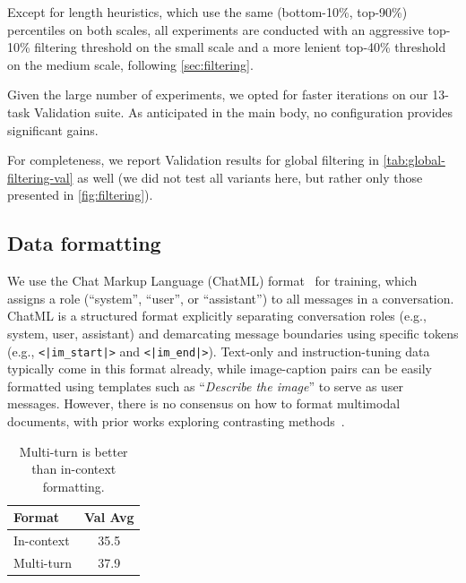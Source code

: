Except for length heuristics, which use the same (bottom-10\%, top-90\%) percentiles on both scales, all experiments are conducted with an aggressive top-10\% filtering threshold on the small scale and a more lenient top-40\% threshold on the medium scale, following \cref{sec:filtering}. 

Given the large number of experiments, we opted for faster iterations on our 13-task Validation suite. 
As anticipated in the main body, no configuration provides significant gains. 

For completeness, we report Validation results for global filtering in \cref{tab:global-filtering-val} as well (we did not test all variants here, but rather only those presented in \cref{fig:filtering}).






\subsection{Data formatting}\label{appsec:formatting}


We use the Chat Markup Language (ChatML) format~\citep{openai2022chatml} for training, which assigns a role (``system'', ``user'', or ``assistant'') to all messages in a conversation. 
ChatML is a structured format explicitly separating conversation roles (e.g., system, user, assistant) and demarcating message boundaries using specific tokens (e.g., \verb+<|im_start|>+ and \verb+<|im_end|>+).
Text-only and instruction-tuning data typically come in this format already, while image-caption pairs can be easily formatted using templates such as ``\textit{Describe the image}'' to serve as user messages. 
However, 
there is no consensus on how to format multimodal documents,
with prior works exploring contrasting methods~\citep{awadalla2024mint,li2024omnicorpus,zhu2023multimodal,laurenccon2023obelics}. 

\begin{table}
    \vspace{-12pt}
    \centering
    \caption{Multi-turn is better than in-context formatting.}
    \label{tab:mmdoc-formatting}
    \small
    \begin{tabular}{lc}
        \toprule
        \textbf{Format} & \textbf{Val Avg} \\
        \midrule
        In-context  & 35.5 \\
        Multi-turn  & 37.9 \\
        \bottomrule
    \end{tabular}
    \vspace{-8pt}
\end{table}

